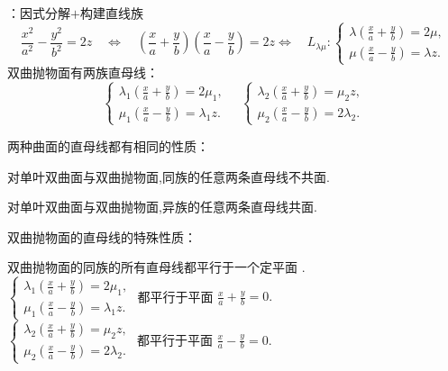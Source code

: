 ：因式分解$+$构建直线族
\begin{equation*}
\displaystyle \frac{x^2}{a^2}-\frac{y^2}{b^2}=2z
\quad \Longleftrightarrow \quad
\left(\frac{x}{a}+\frac{y}{b}\right) \left(\frac{x}{a}-\frac{y}{b}\right)=  2z
\Longleftrightarrow \quad
L_{\lambda \mu}:
\begin{cases}
\displaystyle \lambda \left(\frac{x}{a}+\frac{y}{b}\right)=2 \mu,\\
\displaystyle \mu \left(\frac{x}{a}-\frac{y}{b}\right)=\lambda z.
\end{cases}
\end{equation*}
双曲抛物面有两族直母线：
\begin{equation*}
\begin{cases}
\displaystyle \lambda_1 \left(\frac{x}{a}+\frac{y}{b}\right)=2 \mu_1,\\
\displaystyle \mu_1 \left(\frac{x}{a}-\frac{y}{b}\right)=\lambda_1 z.
\end{cases}
\quad
\begin{cases}
\displaystyle \lambda_2 \left(\frac{x}{a}+\frac{y}{b}\right)=\mu_2 z,\\
\displaystyle \mu_2 \left(\frac{x}{a}-\frac{y}{b}\right)=2 \lambda_2.
\end{cases}
\end{equation*}
\par {\color{dy}两种曲面的直母线都有相同的性质}：

\theorem[直母线性质1]
对单叶双曲面与双曲抛物面,\colorbox{文字底色}{同族的任意两条直母线不共面}.

\theorem[直母线性质2]
对单叶双曲面与双曲抛物面,\colorbox{文字底色}{异族的任意两条直母线共面}.
\\
\par {\color{dy}双曲抛物面的直母线的特殊性质}：

\theorem[双曲抛物面直母线的特殊性质]
双曲抛物面的同族的所有直母线都平行于一个定平面 .\\[9pt]
\kg \kg \kg 
$
\begin{cases}
\displaystyle \lambda_1 \left(\frac{x}{a}+\frac{y}{b}\right)=2 \mu_1,\\
\displaystyle \mu_1 \left(\frac{x}{a}-\frac{y}{b}\right)=\lambda_1 z.
\end{cases}
$
都平行于平面
$\displaystyle \frac{x}{a}+\frac{y}{b}=0.$\\[9pt]
\kg \kg \kg 
$
\begin{cases}
\displaystyle \lambda_2 \left(\frac{x}{a}+\frac{y}{b}\right)=\mu_2 z,\\
\displaystyle \mu_2 \left(\frac{x}{a}-\frac{y}{b}\right)=2 \lambda_2.
\end{cases}
$
都平行于平面
$\displaystyle \frac{x}{a}-\frac{y}{b}=0.$
